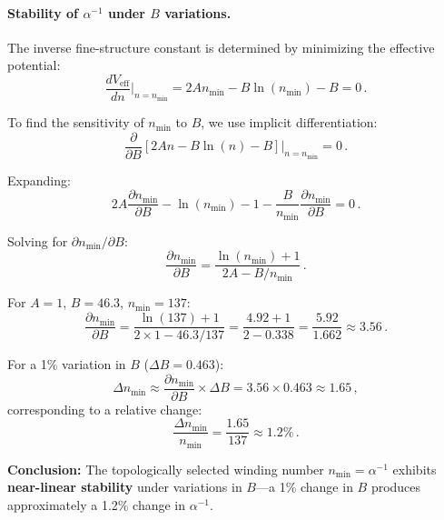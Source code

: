 \documentclass[11pt,a4paper]{article}
\theoremstyle{remark}
\begin{document}
\paragraph{Stability of $\alpha^{-1}$ under $B$ variations.}
The inverse fine-structure constant is determined by minimizing the effective potential:
\begin{equation}
\frac{dV_{\text{eff}}}{dn}\Big|_{n=n_{\text{min}}} = 2A n_{\text{min}} - B\ln(n_{\text{min}}) - B = 0\,.
\label{eq:stationarity-condition}
\end{equation}

To find the sensitivity of $n_{\text{min}}$ to $B$, we use implicit differentiation:
\begin{equation}
\frac{\partial}{\partial B}\left[2A n - B\ln(n) - B\right]\Big|_{n=n_{\text{min}}} = 0\,.
\end{equation}

Expanding:
\begin{equation}
2A \frac{\partial n_{\text{min}}}{\partial B} - \ln(n_{\text{min}}) - 1 - \frac{B}{n_{\text{min}}}\frac{\partial n_{\text{min}}}{\partial B} = 0\,.
\end{equation}

Solving for $\partial n_{\text{min}}/\partial B$:
\begin{equation}
\frac{\partial n_{\text{min}}}{\partial B} = \frac{\ln(n_{\text{min}}) + 1}{2A - B/n_{\text{min}}}\,.
\label{eq:dn_dB}
\end{equation}

For $A=1$, $B=46.3$, $n_{\text{min}}=137$:
\begin{equation}
\frac{\partial n_{\text{min}}}{\partial B} = \frac{\ln(137) + 1}{2 \times 1 - 46.3/137} = \frac{4.92 + 1}{2 - 0.338} = \frac{5.92}{1.662} \approx 3.56\,.
\end{equation}

For a 1\% variation in $B$ ($\Delta B = 0.463$):
\begin{equation}
\Delta n_{\text{min}} \approx \frac{\partial n_{\text{min}}}{\partial B} \times \Delta B = 3.56 \times 0.463 \approx 1.65\,,
\end{equation}
corresponding to a relative change:
\begin{equation}
\frac{\Delta n_{\text{min}}}{n_{\text{min}}} = \frac{1.65}{137} \approx 1.2\%\,.
\end{equation}

\textbf{Conclusion:} The topologically selected winding number $n_{\text{min}} = \alpha^{-1}$ exhibits \textbf{near-linear stability} under variations in $B$—a 1\% change in $B$ produces approximately a 1.2\% change in $\alpha^{-1}$.
\end{document}
